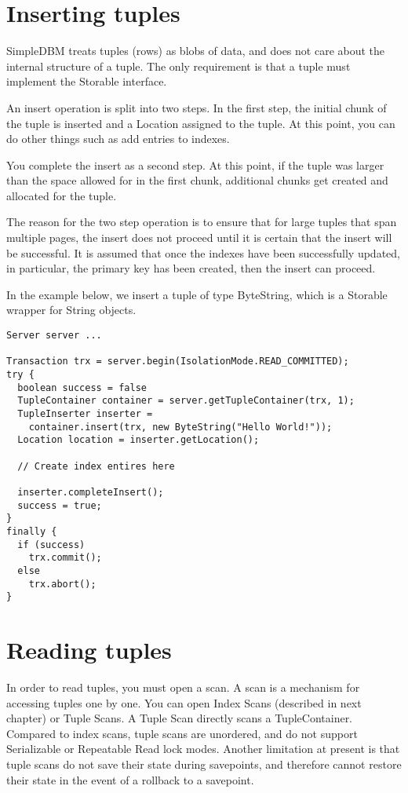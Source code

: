 \documentclass[a4paper,draft,oneside]{book}
\begin{document}
\section{Inserting tuples}

SimpleDBM treats tuples (rows) as blobs of data, and does not care
about the internal structure of a tuple. The only requirement is that
a tuple must implement the Storable interface.

An insert operation is split into two steps. In the first step,
the initial chunk of the tuple is inserted and a Location assigned to
the tuple. At this point, you can do other things such as add entries 
to indexes. 

You complete the insert as a second step. At this point, if the tuple
was larger than the space allowed for in the first chunk, additional
chunks get created and allocated for the tuple.

The reason for the two step operation is to ensure that for large
tuples that span multiple pages, the insert does not proceed until it
is certain that the insert will be successful. It is assumed that once
the indexes have been successfully updated, in particular, the primary
key has been created, then the insert can proceed.

In the example below, we insert a tuple of type ByteString, which is
a Storable wrapper for String objects.

\begin{verbatim}
Server server ...

Transaction trx = server.begin(IsolationMode.READ_COMMITTED);
try {
  boolean success = false      
  TupleContainer container = server.getTupleContainer(trx, 1);
  TupleInserter inserter = 
    container.insert(trx, new ByteString("Hello World!"));
  Location location = inserter.getLocation();
 
  // Create index entires here

  inserter.completeInsert();
  success = true;
}
finally {
  if (success)
    trx.commit();
  else
    trx.abort();
}
\end{verbatim}

\section{Reading tuples}

In order to read tuples, you must open a scan. A scan is a mechanism
for accessing tuples one by one. You can open Index Scans (described
in next chapter) or Tuple Scans. A Tuple Scan directly scans a
TupleContainer.  Compared to index scans, tuple scans are unordered,
and do not support Serializable or Repeatable Read lock modes. Another
limitation at present is that tuple scans do not save their state
during savepoints, and therefore cannot restore their state in the event of
a rollback to a savepoint.
\end{document}
